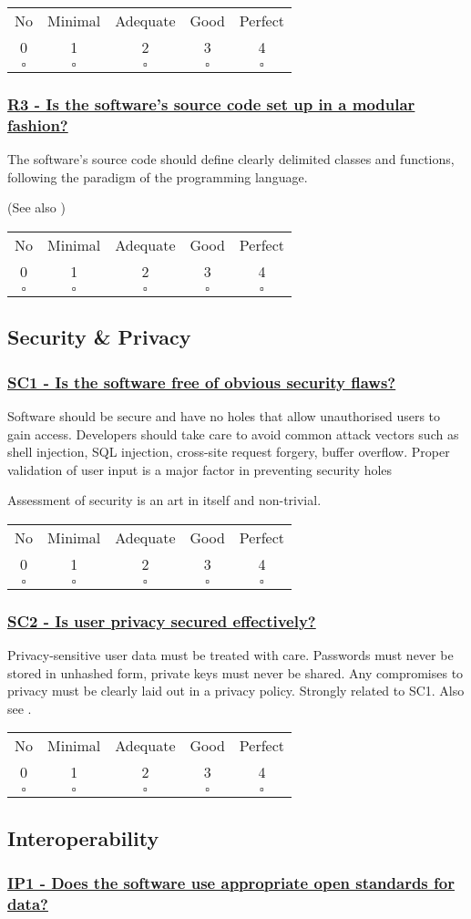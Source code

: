 \documentclass[a4paper,11pt]{article}
\newcommand{\criterion}[2]{\subsubsection*{\underline{#1 - #2}}\label{id:#1}}
\newcommand\CheckTable{%
  \begin{tabular}{ccccc}
    No & Minimal & Adequate & Good & Perfect \\
    0 & 1 & 2 & 3 & 4 \\
    \hline
    $\square$ & $\square$ & $\square$ & $\square$ & $\square$ \\
  \end{tabular}%
}
\newcommand{\refcrit}[1]{%
 \framebox[1.1\width]{\hyperref[id:#1]{#1}}
}
\begin{document}
\CheckTable

\newcommand{\rThreeID}{R3}
\newcommand{\rThreeText}{Is the software's source code set up in a modular fashion?}
\criterion{\rThreeID}{\rThreeText}
%
%
%

The software's source code should define clearly delimited classes and
functions, following the paradigm of the programming language. 

(See also \refcrit{AN1})

\CheckTable

\subsection{Security \& Privacy}\label{sec:sec}

\newcommand{\scOneID}{SC1}
\newcommand{\scOneText}{Is the software free of obvious security flaws?}
\criterion{\scOneID}{\scOneText}

Software should be secure and have no holes that allow unauthorised users to
gain access. Developers should take care to avoid common attack vectors such as
shell injection, SQL injection, cross-site request forgery, buffer overflow.
Proper validation of user input is a major factor in preventing security holes

Assessment of security is an art in itself and non-trivial. 

\CheckTable

\newcommand{\scTwoID}{SC2}
\newcommand{\scTwoText}{Is user privacy secured effectively?}
\criterion{\scTwoID}{\scTwoText}

Privacy-sensitive user data must be treated with care. Passwords must never be
stored in unhashed form, private keys must never be shared. Any compromises to
privacy must be clearly laid out in a privacy policy.  Strongly related to SC1.
Also see \refcrit{AC3}.

\CheckTable

\subsection{Interoperability}\label{sec:int}

\newcommand{\ipOneID}{IP1}
\newcommand{\ipOneText}{Does the software use appropriate open standards for data?}
\criterion{\ipOneID}{\ipOneText}
\end{document}
